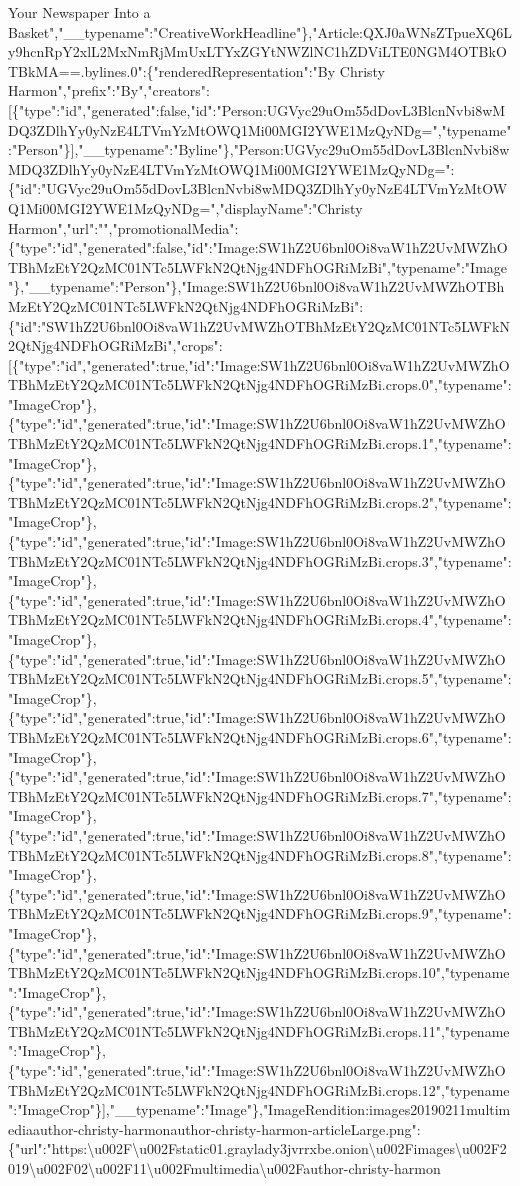 Your Newspaper Into a
Basket","\_\_typename":"CreativeWorkHeadline"\},"Article:QXJ0aWNsZTpueXQ6Ly9hcnRpY2xlL2MxNmRjMmUxLTYxZGYtNWZlNC1hZDViLTE0NGM4OTBkOTBkMA==.bylines.0":\{"renderedRepresentation":"By
Christy
Harmon","prefix":"By","creators":{[}\{"type":"id","generated":false,"id":"Person:UGVyc29uOm55dDovL3BlcnNvbi8wMDQ3ZDlhYy0yNzE4LTVmYzMtOWQ1Mi00MGI2YWE1MzQyNDg=","typename":"Person"\}{]},"\_\_typename":"Byline"\},"Person:UGVyc29uOm55dDovL3BlcnNvbi8wMDQ3ZDlhYy0yNzE4LTVmYzMtOWQ1Mi00MGI2YWE1MzQyNDg=":\{"id":"UGVyc29uOm55dDovL3BlcnNvbi8wMDQ3ZDlhYy0yNzE4LTVmYzMtOWQ1Mi00MGI2YWE1MzQyNDg=","displayName":"Christy
Harmon","url":"","promotionalMedia":\{"type":"id","generated":false,"id":"Image:SW1hZ2U6bnl0Oi8vaW1hZ2UvMWZhOTBhMzEtY2QzMC01NTc5LWFkN2QtNjg4NDFhOGRiMzBi","typename":"Image"\},"\_\_typename":"Person"\},"Image:SW1hZ2U6bnl0Oi8vaW1hZ2UvMWZhOTBhMzEtY2QzMC01NTc5LWFkN2QtNjg4NDFhOGRiMzBi":\{"id":"SW1hZ2U6bnl0Oi8vaW1hZ2UvMWZhOTBhMzEtY2QzMC01NTc5LWFkN2QtNjg4NDFhOGRiMzBi","crops":{[}\{"type":"id","generated":true,"id":"Image:SW1hZ2U6bnl0Oi8vaW1hZ2UvMWZhOTBhMzEtY2QzMC01NTc5LWFkN2QtNjg4NDFhOGRiMzBi.crops.0","typename":"ImageCrop"\},\{"type":"id","generated":true,"id":"Image:SW1hZ2U6bnl0Oi8vaW1hZ2UvMWZhOTBhMzEtY2QzMC01NTc5LWFkN2QtNjg4NDFhOGRiMzBi.crops.1","typename":"ImageCrop"\},\{"type":"id","generated":true,"id":"Image:SW1hZ2U6bnl0Oi8vaW1hZ2UvMWZhOTBhMzEtY2QzMC01NTc5LWFkN2QtNjg4NDFhOGRiMzBi.crops.2","typename":"ImageCrop"\},\{"type":"id","generated":true,"id":"Image:SW1hZ2U6bnl0Oi8vaW1hZ2UvMWZhOTBhMzEtY2QzMC01NTc5LWFkN2QtNjg4NDFhOGRiMzBi.crops.3","typename":"ImageCrop"\},\{"type":"id","generated":true,"id":"Image:SW1hZ2U6bnl0Oi8vaW1hZ2UvMWZhOTBhMzEtY2QzMC01NTc5LWFkN2QtNjg4NDFhOGRiMzBi.crops.4","typename":"ImageCrop"\},\{"type":"id","generated":true,"id":"Image:SW1hZ2U6bnl0Oi8vaW1hZ2UvMWZhOTBhMzEtY2QzMC01NTc5LWFkN2QtNjg4NDFhOGRiMzBi.crops.5","typename":"ImageCrop"\},\{"type":"id","generated":true,"id":"Image:SW1hZ2U6bnl0Oi8vaW1hZ2UvMWZhOTBhMzEtY2QzMC01NTc5LWFkN2QtNjg4NDFhOGRiMzBi.crops.6","typename":"ImageCrop"\},\{"type":"id","generated":true,"id":"Image:SW1hZ2U6bnl0Oi8vaW1hZ2UvMWZhOTBhMzEtY2QzMC01NTc5LWFkN2QtNjg4NDFhOGRiMzBi.crops.7","typename":"ImageCrop"\},\{"type":"id","generated":true,"id":"Image:SW1hZ2U6bnl0Oi8vaW1hZ2UvMWZhOTBhMzEtY2QzMC01NTc5LWFkN2QtNjg4NDFhOGRiMzBi.crops.8","typename":"ImageCrop"\},\{"type":"id","generated":true,"id":"Image:SW1hZ2U6bnl0Oi8vaW1hZ2UvMWZhOTBhMzEtY2QzMC01NTc5LWFkN2QtNjg4NDFhOGRiMzBi.crops.9","typename":"ImageCrop"\},\{"type":"id","generated":true,"id":"Image:SW1hZ2U6bnl0Oi8vaW1hZ2UvMWZhOTBhMzEtY2QzMC01NTc5LWFkN2QtNjg4NDFhOGRiMzBi.crops.10","typename":"ImageCrop"\},\{"type":"id","generated":true,"id":"Image:SW1hZ2U6bnl0Oi8vaW1hZ2UvMWZhOTBhMzEtY2QzMC01NTc5LWFkN2QtNjg4NDFhOGRiMzBi.crops.11","typename":"ImageCrop"\},\{"type":"id","generated":true,"id":"Image:SW1hZ2U6bnl0Oi8vaW1hZ2UvMWZhOTBhMzEtY2QzMC01NTc5LWFkN2QtNjg4NDFhOGRiMzBi.crops.12","typename":"ImageCrop"\}{]},"\_\_typename":"Image"\},"ImageRendition:images20190211multimediaauthor-christy-harmonauthor-christy-harmon-articleLarge.png":\{"url":"https:\textbackslash{}u002F\textbackslash{}u002Fstatic01.graylady3jvrrxbe.onion\textbackslash{}u002Fimages\textbackslash{}u002F2019\textbackslash{}u002F02\textbackslash{}u002F11\textbackslash{}u002Fmultimedia\textbackslash{}u002Fauthor-christy-harmon\text